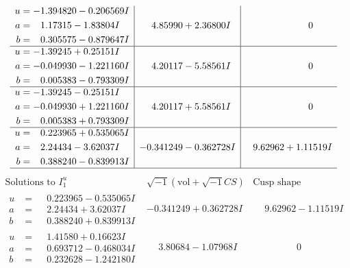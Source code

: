 \documentclass[1p]{elsarticle_modified}
\theoremstyle{definition}
\newcommand{\I}{\sqrt{-1}}
\begin{document}
$$\begin{array}{c|c|c}
\begin{aligned}
u &= -1.394820 - 0.206569 I \\
a &= \phantom{-}1.17315 - 1.83804 I \\
b &= \phantom{-}0.305575 - 0.879647 I\end{aligned}
 & \phantom{-}4.85990 + 2.36800 I & \phantom{-0.000000 } 0 \\ \hline\begin{aligned}
u &= -1.39245 + 0.25151 I \\
a &= -0.049930 - 1.221160 I \\
b &= \phantom{-}0.005383 - 0.793309 I\end{aligned}
 & \phantom{-}4.20117 - 5.58561 I & \phantom{-0.000000 } 0 \\ \hline\begin{aligned}
u &= -1.39245 - 0.25151 I \\
a &= -0.049930 + 1.221160 I \\
b &= \phantom{-}0.005383 + 0.793309 I\end{aligned}
 & \phantom{-}4.20117 + 5.58561 I & \phantom{-0.000000 } 0 \\ \hline\begin{aligned}
u &= \phantom{-}0.223965 + 0.535065 I \\
a &= \phantom{-}2.24434 - 3.62037 I \\
b &= \phantom{-}0.388240 - 0.839913 I\end{aligned}
 & -0.341249 - 0.362728 I & \phantom{-}9.62962 + 1.11519 I\\
 \hline 
 \end{array}$$\newpage$$\begin{array}{c|c|c}  
\text{Solutions to }I^u_{1}& \I (\text{vol} + \sqrt{-1}CS) & \text{Cusp shape}\\
 \hline 
\begin{aligned}
u &= \phantom{-}0.223965 - 0.535065 I \\
a &= \phantom{-}2.24434 + 3.62037 I \\
b &= \phantom{-}0.388240 + 0.839913 I\end{aligned}
 & -0.341249 + 0.362728 I & \phantom{-}9.62962 - 1.11519 I \\ \hline\begin{aligned}
u &= \phantom{-}1.41580 + 0.16623 I \\
a &= \phantom{-}0.693712 - 0.468034 I \\
b &= \phantom{-}0.232628 - 1.242180 I\end{aligned}
 & \phantom{-}3.80684 - 1.07968 I & \phantom{-0.000000 } 0 \\ \hline\begin{aligned}

\end{aligned}
\end{array}$$
\end{document}
